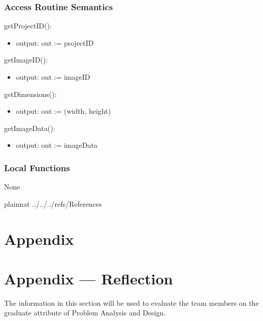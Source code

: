 \documentclass[12pt, titlepage]{article}
\begin{document}
\subsubsection{Access Routine Semantics}

\noindent getProjectID():
\begin{itemize}
\item output: out := projectID
\end{itemize}

\noindent getImageID():
\begin{itemize}
\item output: out := imageID
\end{itemize}

\noindent getDimensions():
\begin{itemize}
\item output: out := (width, height)
\end{itemize}

\noindent getImageData():
\begin{itemize}
\item output: out := imageData
\end{itemize}

\subsubsection{Local Functions}
None

\newpage

 {plainnat}
 {../../../refs/References}

\newpage

\section{Appendix} \label{Appendix}


\newpage{}

\section*{Appendix --- Reflection}


The information in this section will be used to evaluate the team members on the
graduate attribute of Problem Analysis and Design.


\end{document}
